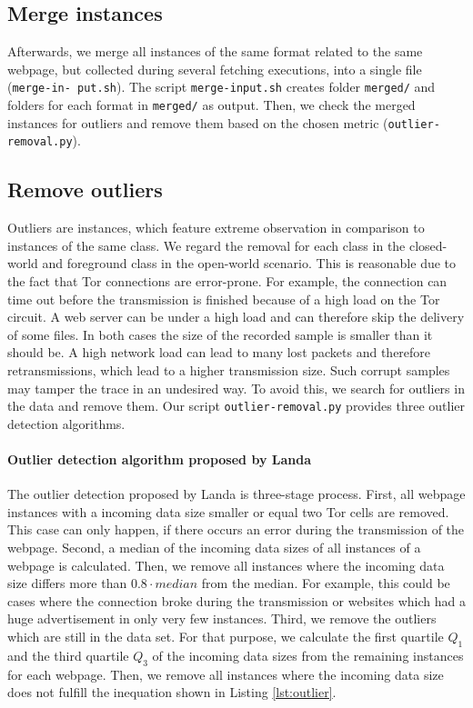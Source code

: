 \subsection{Merge instances}\label{Merge instances}
Afterwards, we merge all instances of the same format related to the same webpage, but collected during several fetching executions, into a single file (\texttt{merge-in- put.sh}). The script \texttt{merge-input.sh} creates folder \texttt{merged/} and folders for each format in \texttt{merged/} as output. Then, we check the merged instances for outliers and remove them based on the chosen metric (\texttt{outlier-removal.py}). 

\subsection{Remove outliers}\label{Remove outliers}
Outliers are instances, which feature extreme observation in comparison to instances of the same class. We regard the removal for each class in the closed-world and foreground class in the open-world scenario. This is reasonable due to the fact that Tor connections are error-prone. For example, the connection can time out before the transmission is finished because of a high load on the Tor circuit. A web server can be under a high load and can therefore skip the delivery of some files. In both cases the size of the recorded sample is smaller than it should be. A high network load can lead to many lost packets and therefore retransmissions, which lead to a higher transmission size. Such corrupt samples may tamper the trace in an undesired way. To avoid this, we search for outliers in the data and remove them. Our script \texttt{outlier-removal.py} provides three outlier detection algorithms.

\paragraph{Outlier detection algorithm proposed by Landa \cite{Landa2013}}
\label{par:landa_outlier}

The outlier detection proposed by Landa \cite{Landa2013} is three-stage process. First, all webpage instances with a incoming data size smaller or equal
two Tor cells are removed. This case can only happen, if there occurs an error during the transmission of the webpage. Second, a median of the incoming data sizes of all instances of a webpage is calculated. Then, we remove all instances where the incoming data size differs more than $0.8 \cdot median$ from the median. For example, this could be cases where the connection broke during the transmission or websites which had a huge advertisement in only very few instances. Third, we remove the outliers which are still in the data set. For that purpose, we calculate the first quartile $Q_{1}$ and the third quartile $Q_{3}$ of the incoming data sizes from the remaining instances for each webpage. Then, we remove all instances where the incoming data size does not fulfill the inequation shown in Listing \ref{lst:outlier}.

